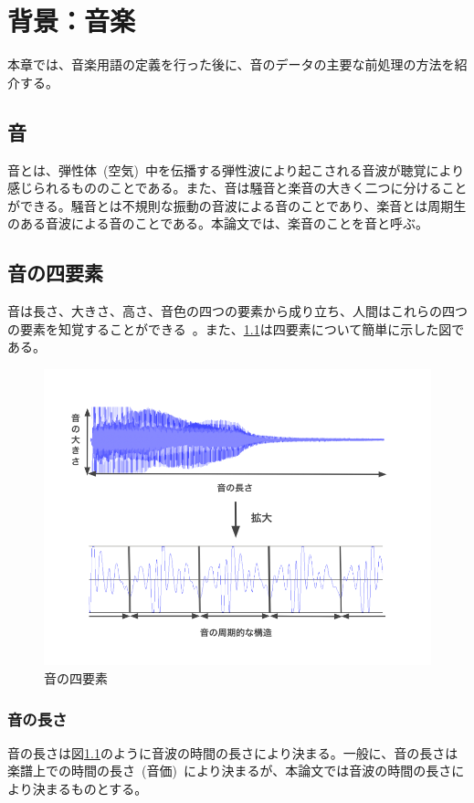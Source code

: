 \chapter{背景：音楽}

本章では、音楽用語の定義を行った後に、音のデータの主要な前処理の方法を紹介する。

\section{音}

音とは、弾性体~(空気)~中を伝播する弾性波により起こされる音波が聴覚により感じられるもののことである。また、音は騒音と楽音の大きく二つに分けることができる。騒音とは不規則な振動の音波による音のことであり、楽音とは周期生のある音波による音のことである。本論文では、楽音のことを音と呼ぶ。

\section{音の四要素}

音は長さ、大きさ、高さ、音色の四つの要素から成り立ち、人間はこれらの四つの要素を知覚することができる~\cite{音楽の基礎}。また、\ref{fig:gakuon}は四要素について簡単に示した図である。

\begin{figure}[b]
\begin{center}
\includegraphics[width=0.6\hsize]{figure/gakuon.png}
\caption{音の四要素}
\label{fig:gakuon}
\end{center}
\end{figure}

\subsection{音の長さ}

音の長さは図\ref{fig:gakuon}のように音波の時間の長さにより決まる。一般に、音の長さは楽譜上での時間の長さ~(音価)~により決まるが、本論文では音波の時間の長さにより決まるものとする。

